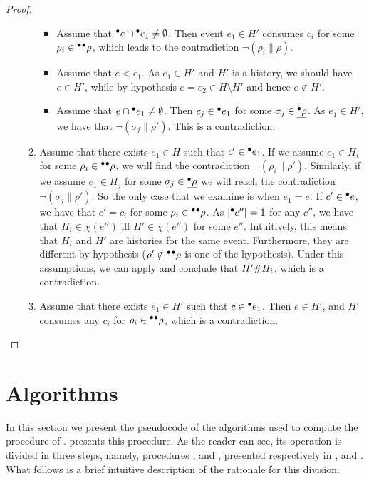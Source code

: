 \begin{proof}
\begin{enumerate}[(a)]
\begin{enumerate}[1.]
\begin{itemize}
\item Assume that ${}^\bullet e \cap {}^\bullet e_1 \not= \emptyset$.  Then event $e_1
\in H'$ consumes $c_i$ for some $\rho_i \in {}^\bullet{}^\bullet\rho$, which leads to the
contradiction $\lnot (\rho_i \parallel \rho)$.

\item Assume that $e < e_1$.  As $e_1 \in H'$ and $H'$ is a history, we should
have $e \in H'$, while by hypothesis $e = e_2 \in H \setminus H'$ and hence $e
\notin H'$.

\item Assume that $\underline{e} \cap {}^\bullet e_1 \not= \emptyset$.  Then $c_j \in
{}^\bullet e_1$ for some $\sigma_j \in \underline{{}^\bullet\rho}$.  As $e_1 \in H'$, we have
that $\lnot (\sigma_j \parallel \rho')$.  This is a contradiction.
\end{itemize}

\item Assume that there exists $e_1 \in H$ such that $c' \in {}^\bullet e_1$.  If we
assume $e_1 \in H_i$ for some $\rho_i \in {}^\bullet{}^\bullet\rho$, we will find the
contradiction $\lnot (\rho_i \parallel \rho')$.  Similarly, if we assume $e_1
\in H_j$ for some $\sigma_j \in \underline{{}^\bullet\rho}$ we will reach the
contradiction $\lnot (\sigma_j \parallel \rho')$.  So the only case that we
examine is when $e_1 = e$.  If $c' \in {}^\bullet e$, we have that $c' = c_i$ for
some $\rho_i \in {}^\bullet{}^\bullet\rho$.  As $|{}^\bullet c''| = 1$ for any $c''$, we have
that $H_i \in \chi(e'')$ iff $H' \in \chi(e'')$ for some $e''$.  Intuitively,
this means that $H_i$ and $H'$ are histories for the same event.  Furthermore,
they are different by hypothesis ($\rho' \notin {}^\bullet{}^\bullet\rho$ is one of the
hypothesis).  Under this assumptions, we can apply  and conclude
that $H' \mathord{\#} H_i$, which is a contradiction.

\item Assume that there exists $e_1 \in H'$ such that $c \in {}^\bullet e_1$.  Then
$e \in H'$, and $H'$ consumes any $c_i$ for $\rho_i \in {}^\bullet{}^\bullet\rho$, which
is a contradiction.
\end{enumerate}
\end{enumerate}
\end{proof}


\section{Algorithms}
\label{ape:algorithms}

In this section we present the pseudocode of the algorithms used to compute the
procedure \peupdate{} of .   presents
this procedure.  As the reader can see, its operation is divided in three
steps, namely, procedures \peupdatecont{}, \peupdatexisting{} and
\peupdatenew{}, presented respectively in ,
 and .  What follows is a brief
intuitive description of the rationale for this division.

